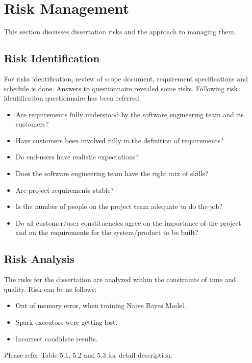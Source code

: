 \documentclass[oneside,a4paper,12pt]{pictreport}
\begin{document}
\section{Risk Management}
This section discusses dissertation risks and the approach to managing them.
\subsection{Risk Identification}
For risks identification, review of scope document, requirement specifications and schedule is done. Answers to questionnaire revealed some risks. Following risk identification questionnaire has been referred.
\begin{itemize}
\item Are requirements fully understood by the software engineering team and its customers?
\item Have customers been involved fully in the definition of requirements?
\item Do end-users have realistic expectations?
\item Does the software engineering team have the right mix of skills?
\item Are project requirements stable?
\item Is the number of people on the project team adequate to do the job?
\item Do all customer/user constituencies agree on the importance of the project and on the requirements for the system/product to be built?
\end{itemize}

\subsection{Risk Analysis}
The risks for the dissertation are analyzed within the constraints of time and quality. Risk can be as follows:

\begin{itemize}
\item Out of memory error, when training Naive Bayes Model.
\item Spark executors were getting lost.
\item Incorrect candidate results.
\end{itemize}
Please refer Table 5.1, 5.2 and 5.3 for detail description.
\end{document}
